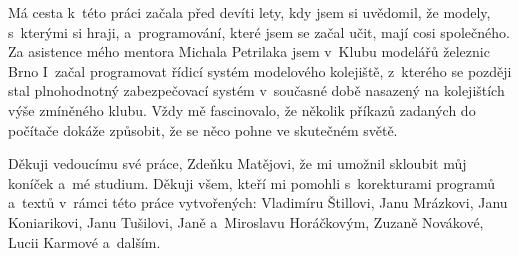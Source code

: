 Má cesta k~této práci začala před devíti lety, kdy jsem si uvědomil, že modely,
s~kterými si hraji, a~programování, které jsem se začal učit, mají cosi
společného. Za asistence mého mentora Michala Petrilaka jsem v~Klubu modelářů
železnic Brno I~začal programovat řídicí systém modelového kolejiště, z~kterého
se později stal plnohodnotný zabezpečovací systém v~současné době nasazený na
kolejištích výše zmíněného klubu. Vždy mě fascinovalo, že několik příkazů
zadaných do počítače dokáže způsobit, že se něco pohne ve skutečném světě.

Děkuji vedoucímu své práce, Zdeňku Matějovi, že mi umožnil skloubit můj koníček
a~mé studium. Děkuji všem, kteří mi pomohli s~korekturami programů a~textů
v~rámci této práce vytvořených: Vladimíru Štillovi, Janu Mrázkovi, Janu
Koniarikovi, Janu Tušilovi, Janě a~Miroslavu Horáčkovým, Zuzaně Novákové,
Lucii Karmové a~dalším.

